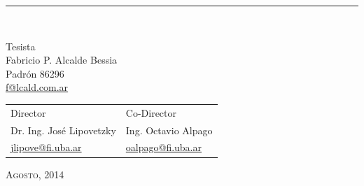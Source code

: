 \begin{titlepage}
\begin{center}
	\rule{\textwidth}{0.1em}\\
	
	\vspace*{0.15in}
	
	\begin{large}
		Tesista\\
		Fabricio P. Alcalde Bessia\\
		Padrón \textnumero{}86296\\
		\url{f@lcald.com.ar}\\
	\end{large}
	
	\vspace*{0.5in}
	
	\begin{large}
		\begin{tabu} to 0.8\linewidth {X[c]X[c]}
			Director & Co-Director \\
			Dr. Ing. José Lipovetzky & Ing. Octavio Alpago \\
			\url{jlipove@fi.uba.ar} & \url{oalpago@fi.uba.ar} \\
		\end{tabu}
	\end{large}
	
	\vfill{}
	
	\begin{large}
		\textsc{Agosto, 2014}
	\end{large}
\end{center}

\end{titlepage}
